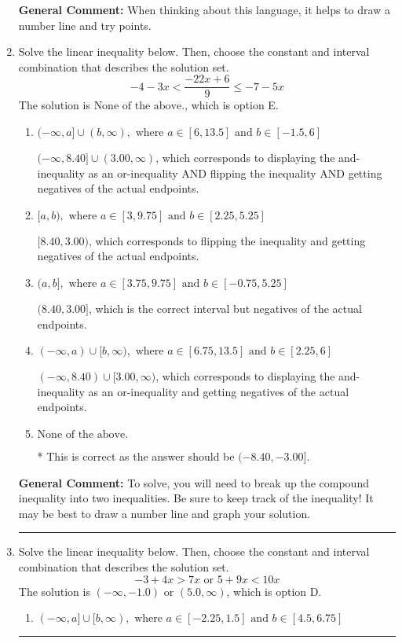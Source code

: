\documentclass{extbook}[14pt]
\newcommand{\litem}[1]{\item #1

\rule{\textwidth}{0.4pt}}
\begin{document}
\begin{enumerate}
{\textbf{General Comment:} When thinking about this language, it helps to draw a number line and try points.
}
\litem{
Solve the linear inequality below. Then, choose the constant and interval combination that describes the solution set.
\[ -4 - 3 x < \frac{-22 x + 6}{9} \leq -7 - 5 x \]The solution is \( \text{None of the above.} \), which is option E.\begin{enumerate}[label=\Alph*.]
\item \( (-\infty, a] \cup (b, \infty), \text{ where } a \in [6, 13.5] \text{ and } b \in [-1.5, 6] \)

$(-\infty, 8.40] \cup (3.00, \infty)$, which corresponds to displaying the and-inequality as an or-inequality AND flipping the inequality AND getting negatives of the actual endpoints.
\item \( [a, b), \text{ where } a \in [3, 9.75] \text{ and } b \in [2.25, 5.25] \)

$[8.40, 3.00)$, which corresponds to flipping the inequality and getting negatives of the actual endpoints.
\item \( (a, b], \text{ where } a \in [3.75, 9.75] \text{ and } b \in [-0.75, 5.25] \)

$(8.40, 3.00]$, which is the correct interval but negatives of the actual endpoints.
\item \( (-\infty, a) \cup [b, \infty), \text{ where } a \in [6.75, 13.5] \text{ and } b \in [2.25, 6] \)

$(-\infty, 8.40) \cup [3.00, \infty)$, which corresponds to displaying the and-inequality as an or-inequality and getting negatives of the actual endpoints.
\item \( \text{None of the above.} \)

* This is correct as the answer should be $(-8.40, -3.00]$.
\end{enumerate}

\textbf{General Comment:} To solve, you will need to break up the compound inequality into two inequalities. Be sure to keep track of the inequality! It may be best to draw a number line and graph your solution.
}
\litem{
Solve the linear inequality below. Then, choose the constant and interval combination that describes the solution set.
\[ -3 + 4 x > 7 x \text{ or } 5 + 9 x < 10 x \]The solution is \( (-\infty, -1.0) \text{ or } (5.0, \infty) \), which is option D.\begin{enumerate}[label=\Alph*.]
\item \( (-\infty, a] \cup [b, \infty), \text{ where } a \in [-2.25, 1.5] \text{ and } b \in [4.5, 6.75] \)


\end{enumerate}}
\end{enumerate}
\end{document}
